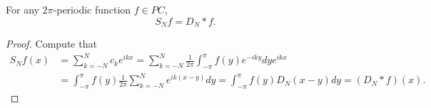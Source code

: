 \begin{proposition}
    For any $2\pi$-periodic function $f\in PC$,
    \begin{equation*}
        S_Nf = D_N*f.
    \end{equation*}
\end{proposition}
\begin{proof}
    Compute that 
    \begin{equation*}
        \begin{split}
            S_Nf(x) &= \sum_{k=-N}^N c_k e^{ikx} = \sum_{k=-N}^N \frac{1}{2\pi} \int_{-\pi}^\pi f(y)e^{-iky}dy e^{ikx} \\
            &= \int_{-\pi}^\pi f(y) \frac{1}{2\pi}\sum_{k=-N}^N e^{ik(x-y)}dy = \int_{-\pi}^\pi f(y)D_N(x-y)dy = (D_N*f)(x).
        \end{split}
    \end{equation*}
\end{proof}

